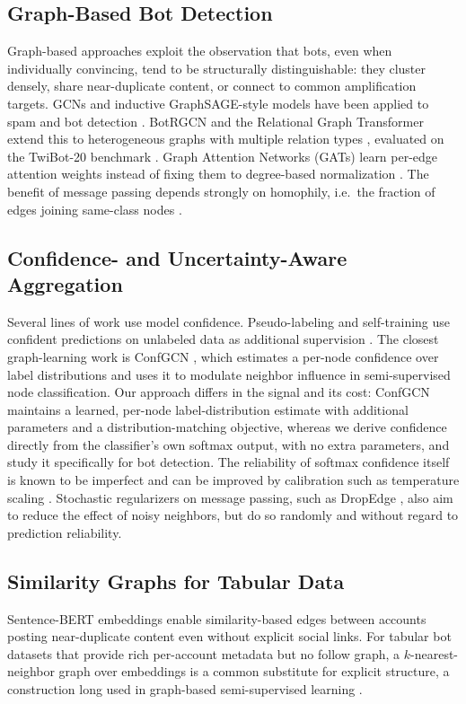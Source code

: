 \documentclass{csimq}
\begin{document}
\subsection{Graph-Based Bot Detection}
Graph-based approaches exploit the observation that bots, even when individually convincing, tend to be structurally distinguishable: they cluster densely, share near-duplicate content, or connect to common amplification targets. GCNs \cite{kipf2017gcn} and inductive GraphSAGE-style models \cite{hamilton2017sage} have been applied to spam and bot detection \cite{alhosseini2019detect}. BotRGCN and the Relational Graph Transformer extend this to heterogeneous graphs with multiple relation types \cite{feng2021botrgcn,feng2022rgt}, evaluated on the TwiBot-20 benchmark \cite{feng2021twibot20}. Graph Attention Networks (GATs) learn per-edge attention weights instead of fixing them to degree-based normalization \cite{velickovic2018gat}. The benefit of message passing depends strongly on homophily, i.e.\ the fraction of edges joining same-class nodes \cite{zhu2020beyond}.

\subsection{Confidence- and Uncertainty-Aware Aggregation}
Several lines of work use model confidence. Pseudo-labeling and self-training use confident predictions on unlabeled data as additional supervision \cite{lee2013pseudo}. The closest graph-learning work is ConfGCN \cite{vashishth2019confgcn}, which estimates a per-node confidence over label distributions and uses it to modulate neighbor influence in semi-supervised node classification. Our approach differs in the signal and its cost: ConfGCN maintains a learned, per-node label-distribution estimate with additional parameters and a distribution-matching objective, whereas we derive confidence directly from the classifier's own softmax output, with no extra parameters, and study it specifically for bot detection. The reliability of softmax confidence itself is known to be imperfect and can be improved by calibration such as temperature scaling \cite{guo2017calibration}. Stochastic regularizers on message passing, such as DropEdge \cite{rong2020dropedge}, also aim to reduce the effect of noisy neighbors, but do so randomly and without regard to prediction reliability.

\subsection{Similarity Graphs for Tabular Data}
Sentence-BERT embeddings \cite{reimers2019sbert} enable similarity-based edges between accounts posting near-duplicate content even without explicit social links. For tabular bot datasets that provide rich per-account metadata but no follow graph, a $k$-nearest-neighbor graph over embeddings is a common substitute for explicit structure, a construction long used in graph-based semi-supervised learning \cite{zhu2003semi}.
\end{document}
